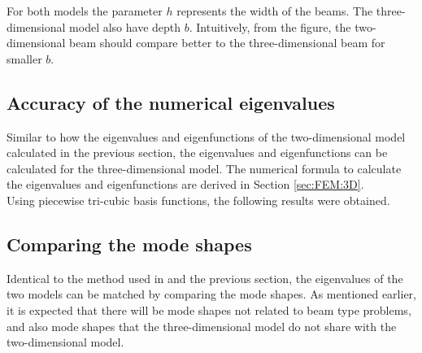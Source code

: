 \documentclass[../../main.tex]{subfiles}
\begin{document}
\begin{figure}[h!]
{{\begin{minipage}[b]{0.7\linewidth}
				
			\end{minipage}
		}
	}
\end{figure}
\FloatBarrier

For both models the parameter $h$ represents the width of the beams. The three-dimensional model also have depth $b$. Intuitively, from the figure, the two-dimensional beam should compare better to the three-dimensional beam for smaller $b$.

\subsection{Accuracy of the numerical eigenvalues}
Similar to how the eigenvalues and eigenfunctions of the two-dimensional model calculated in the previous section, the eigenvalues and eigenfunctions can be calculated for the three-dimensional model. The numerical formula to calculate the eigenvalues and eigenfunctions are derived in Section \ref{sec:FEM:3D}.\\

Using piecewise tri-cubic basis functions, the following results were obtained.\\



\subsection{Comparing the mode shapes}
Identical to the method used in \cite{LVV09} and the previous section, the eigenvalues of the two models can be matched by comparing the mode shapes. As mentioned earlier, it is expected that there will be mode shapes not related to beam type problems, and also mode shapes that the three-dimensional model do not share with the two-dimensional model.\\
\end{document}
